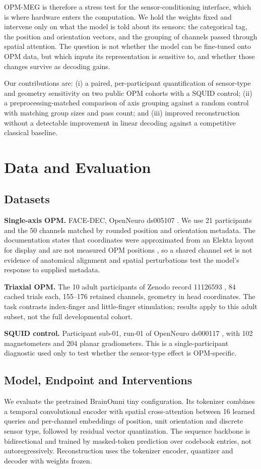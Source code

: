 \documentclass[letterpaper]{article}
\begin{document}
OPM-MEG is therefore a stress test for the sensor-conditioning interface, which is where hardware enters the computation. We hold the weights fixed and intervene only on what the model is told about its sensors: the categorical tag, the position and orientation vectors, and the grouping of channels passed through spatial attention. The question is not whether the model can be fine-tuned onto OPM data, but which inputs its representation is sensitive to, and whether those changes survive as decoding gains.

Our contributions are: (i) a paired, per-participant quantification of sensor-type and geometry sensitivity on two public OPM cohorts with a SQUID control; (ii) a preprocessing-matched comparison of axis grouping against a random control with matching group sizes and pass count; and (iii) improved reconstruction without a detectable improvement in linear decoding against a competitive classical baseline.

\section{Data and Evaluation}

\subsection{Datasets}
\textbf{Single-axis OPM.} FACE-DEC, OpenNeuro ds005107 \citep{xu2024face}. We use 21 participants and the 50 channels matched by rounded position and orientation metadata. The documentation states that coordinates were approximated from an Elekta layout for display and are not measured OPM positions \citep{facedecdocs}, so a shared channel set is not evidence of anatomical alignment and spatial perturbations test the model's response to supplied metadata.

\textbf{Triaxial OPM.} The 10 adult participants of Zenodo record 11126593 \citep{rier2024dataset}, 84 cached trials each, 155--176 retained channels, geometry in head coordinates. The task contrasts index-finger and little-finger stimulation; results apply to this adult subset, not the full developmental cohort.

\textbf{SQUID control.} Participant sub-01, run-01 of OpenNeuro ds000117 \citep{wakeman2015}, with 102 magnetometers and 204 planar gradiometers. This is a single-participant diagnostic used only to test whether the sensor-type effect is OPM-specific.

\subsection{Model, Endpoint and Interventions}
We evaluate the pretrained BrainOmni tiny configuration. Its tokenizer combines a temporal convolutional encoder with spatial cross-attention between 16 learned queries and per-channel embeddings of position, unit orientation and discrete sensor type, followed by residual vector quantization. The sequence backbone is bidirectional and trained by masked-token prediction over codebook entries, not autoregressively. Reconstruction uses the tokenizer encoder, quantizer and decoder with weights frozen.
\end{document}
